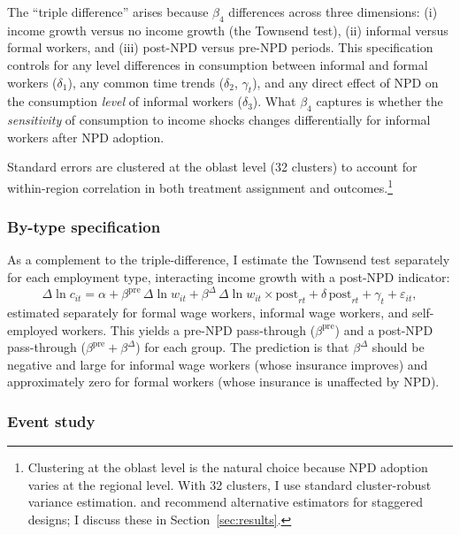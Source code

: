 \documentclass[12pt]{article}
\begin{document}
The ``triple difference'' arises because $\beta_4$ differences across three dimensions: (i) income growth versus no income growth (the Townsend test), (ii) informal versus formal workers, and (iii) post-NPD versus pre-NPD periods. This specification controls for any level differences in consumption between informal and formal workers ($\delta_1$), any common time trends ($\delta_2$, $\gamma_t$), and any direct effect of NPD on the consumption \textit{level} of informal workers ($\delta_3$). What $\beta_4$ captures is whether the \textit{sensitivity} of consumption to income shocks changes differentially for informal workers after NPD adoption.

Standard errors are clustered at the oblast level (32 clusters) to account for within-region correlation in both treatment assignment and outcomes.\footnote{Clustering at the oblast level is the natural choice because NPD adoption varies at the regional level. With 32 clusters, I use standard cluster-robust variance estimation. \citet{CallawayS2021} and \citet{SunAbraham2021} recommend alternative estimators for staggered designs; I discuss these in Section~\ref{sec:results}.}

\subsubsection{By-type specification}

As a complement to the triple-difference, I estimate the Townsend test separately for each employment type, interacting income growth with a post-NPD indicator:
\begin{equation}\label{eq:bytype}
\Delta \ln c_{it} = \alpha + \beta^{\text{pre}} \, \Delta \ln w_{it} + \beta^{\Delta} \, \Delta \ln w_{it} \times \text{post}_{rt} + \delta \, \text{post}_{rt} + \gamma_t + \varepsilon_{it},
\end{equation}
estimated separately for formal wage workers, informal wage workers, and self-employed workers. This yields a pre-NPD pass-through ($\beta^{\text{pre}}$) and a post-NPD pass-through ($\beta^{\text{pre}} + \beta^{\Delta}$) for each group. The prediction is that $\beta^{\Delta}$ should be negative and large for informal wage workers (whose insurance improves) and approximately zero for formal workers (whose insurance is unaffected by NPD).

\subsubsection{Event study}
\end{document}
